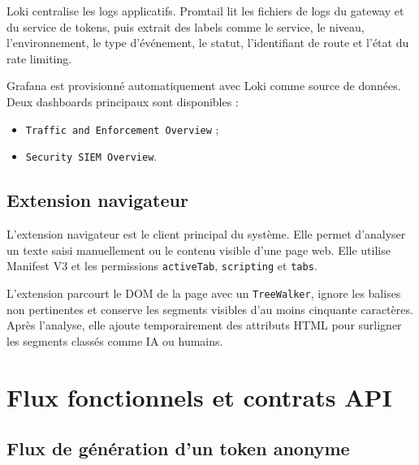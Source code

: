 ﻿\documentclass[12pt, a4paper]{report}
\begin{document}
Loki centralise les logs applicatifs. Promtail lit les fichiers de logs du
gateway et du service de tokens, puis extrait des labels comme le service, le
niveau, l'environnement, le type d'événement, le statut, l'identifiant de route
et l'état du rate limiting.

Grafana est provisionné automatiquement avec Loki comme source de données. Deux
dashboards principaux sont disponibles :

\begin{itemize}
  \item \texttt{Traffic and Enforcement Overview} ;
  \item \texttt{Security SIEM Overview}.
\end{itemize}

\section{Extension navigateur}

L'extension navigateur est le client principal du système. Elle permet
d'analyser un texte saisi manuellement ou le contenu visible d'une page web. Elle
utilise Manifest V3 et les permissions \texttt{activeTab}, \texttt{scripting} et
\texttt{tabs}.

L'extension parcourt le DOM de la page avec un \texttt{TreeWalker}, ignore les
balises non pertinentes et conserve les segments visibles d'au moins cinquante
caractères. Après l'analyse, elle ajoute temporairement des attributs HTML pour
surligner les segments classés comme IA ou humains.


\chapter{Flux fonctionnels et contrats API}

\section{Flux de génération d'un token anonyme}
\end{document}
